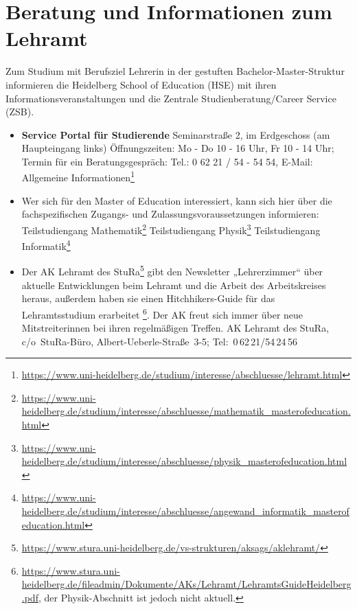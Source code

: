 \section{Beratung und Informationen zum Lehramt}
\label{lehramtkontakte}

Zum Studium mit Berufsziel Lehrerin in der gestuften Bachelor-Master-Struktur informieren die Heidelberg School of Education (HSE) mit ihren Informationsveranstaltungen und die Zentrale Studienberatung/Career Service (ZSB).
\begin{itemize}
    \item \textbf{Service Portal für Studierende} \newline
          Seminarstraße 2, im Erdgeschoss (am Haupteingang links)
          Öffnungszeiten: Mo - Do 10 - 16 Uhr, Fr 10 - 14 Uhr; \newline
          Termin für ein Beratungsgespräch: Tel.: 0 62 21 / 54 - 54 54, E-Mail:  \newline
          Allgemeine Informationen\footnote{\url{https://www.uni-heidelberg.de/studium/interesse/abschluesse/lehramt.html}}

    \item Wer sich für den Master of Education interessiert, kann sich hier über die fachspezifischen Zugangs- und Zulassungsvoraussetzungen informieren: \newline
          Teilstudiengang Mathematik\footnote{\url{https://www.uni-heidelberg.de/studium/interesse/abschluesse/mathematik_masterofeducation.html}} \newline
          Teilstudiengang Physik\footnote{\url{https://www.uni-heidelberg.de/studium/interesse/abschluesse/physik_masterofeducation.html}} \newline
          Teilstudiengang Informatik\footnote{\url{https://www.uni-heidelberg.de/studium/interesse/abschluesse/angewand_informatik_masterofeducation.html}}

    \item Der AK Lehramt des StuRa\footnote{\url{https://www.stura.uni-heidelberg.de/vs-strukturen/aksags/aklehramt/}} gibt den Newsletter „Lehrerzimmer“ über aktuelle Entwicklungen beim Lehramt und die Arbeit des Arbeitskreises heraus, außerdem haben sie einen Hitchhikers-Guide für das Lehramtsstudium erarbeitet \footnote{\url{https://www.stura.uni-heidelberg.de/fileadmin/Dokumente/AKs/Lehramt/LehramtsGuideHeidelberg.pdf}, der Physik-Abschnitt ist jedoch nicht aktuell.}. Der AK freut sich immer über neue Mitstreiterinnen bei ihren regelmäßigen Treffen.  \newline AK Lehramt des StuRa, c/o~StuRa-Büro, Albert-Ueberle-Straße~3-5; Tel:~0\,62\,21/54\,24\,56


\end{itemize}
